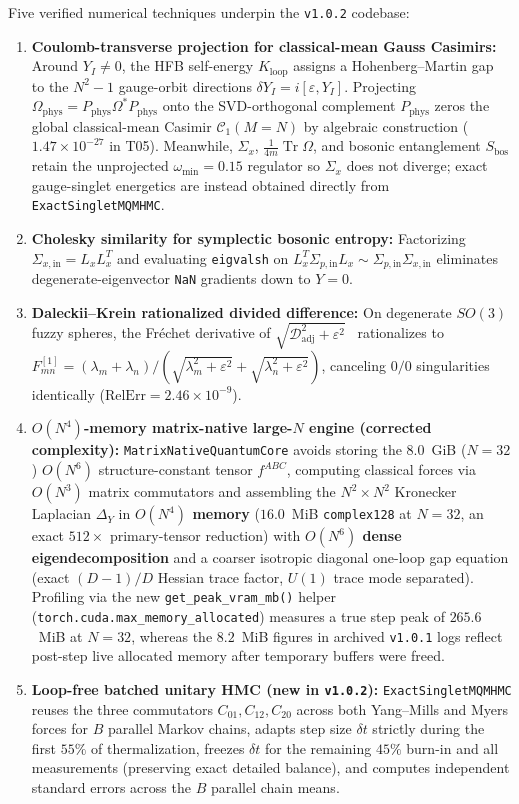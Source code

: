 \documentclass[11pt,a4paper]{article}
\DeclareMathOperator{\Tr}{Tr}
\begin{document}
Five verified numerical techniques underpin the \texttt{v1.0.2} codebase:
\begin{enumerate}
  \item \textbf{Coulomb-transverse projection for classical-mean Gauss Casimirs:} Around $Y_I \neq 0$, the HFB self-energy $K_{\mathrm{loop}}$ assigns a Hohenberg--Martin gap~\cite{Hohenberg1965} to the $N^2-1$ gauge-orbit directions $\delta Y_I = i[\varepsilon, Y_I]$. Projecting $\Omega_{\mathrm{phys}} = P_{\mathrm{phys}}\Omega^* P_{\mathrm{phys}}$ onto the SVD-orthogonal complement $P_{\mathrm{phys}}$ zeros the global classical-mean Casimir $\mathcal{C}_1(M=N)$ by algebraic construction ($1.47\times 10^{-27}$ in T05). Meanwhile, $\Sigma_x$, $\frac{1}{4m}\Tr\Omega$, and bosonic entanglement $S_{\mathrm{bos}}$ retain the unprojected $\omega_{\min}=0.15$ regulator so $\Sigma_x$ does not diverge; exact gauge-singlet energetics are instead obtained directly from \texttt{ExactSingletMQMHMC}.
  \item \textbf{Cholesky similarity for symplectic bosonic entropy:} Factorizing $\Sigma_{x,\mathrm{in}} = L_x L_x^T$ and evaluating \texttt{eigvalsh} on $L_x^T \Sigma_{p,\mathrm{in}} L_x \sim \Sigma_{p,\mathrm{in}}\Sigma_{x,\mathrm{in}}$ eliminates degenerate-eigenvector \texttt{NaN} gradients down to $Y=0$.
  \item \textbf{Daleckii--Krein rationalized divided difference:} On degenerate $SO(3)$ fuzzy spheres, the Fr\'echet derivative of $\sqrt{\mathcal{D}_{\mathrm{adj}}^2 + \varepsilon^2}$~\cite{Bhatia1997} rationalizes to $F^{[1]}_{mn} = (\lambda_m+\lambda_n)/(\sqrt{\lambda_m^2+\varepsilon^2}+\sqrt{\lambda_n^2+\varepsilon^2})$, canceling $0/0$ singularities identically ($\mathrm{RelErr} = 2.46\times 10^{-9}$).
  \item \textbf{$O(N^4)$-memory matrix-native large-$N$ engine (corrected complexity):} \texttt{MatrixNativeQuantumCore} avoids storing the $8.0$~GiB ($N=32$) $O(N^6)$ structure-constant tensor $f^{ABC}$, computing classical forces via $O(N^3)$ matrix commutators and assembling the $N^2\times N^2$ Kronecker Laplacian $\Delta_Y$ in \textbf{$O(N^4)$ memory} ($16.0$~MiB \texttt{complex128} at $N=32$, an exact $512\times$ primary-tensor reduction) with \textbf{$O(N^6)$ dense eigendecomposition} and a coarser isotropic diagonal one-loop gap equation (exact $(D-1)/D$ Hessian trace factor, $U(1)$ trace mode separated). Profiling via the new \texttt{get\_peak\_vram\_mb()} helper (\texttt{torch.cuda.max\_memory\_allocated}) measures a true step peak of $265.6$~MiB at $N=32$, whereas the $8.2$~MiB figures in archived \texttt{v1.0.1} logs reflect post-step live allocated memory after temporary buffers were freed.
  \item \textbf{Loop-free batched unitary HMC (new in \texttt{v1.0.2}):} \texttt{ExactSingletMQMHMC} reuses the three commutators $C_{01}, C_{12}, C_{20}$ across both Yang--Mills and Myers forces for $B$ parallel Markov chains, adapts step size $\delta t$ strictly during the first $55\%$ of thermalization, freezes $\delta t$ for the remaining $45\%$ burn-in and all measurements (preserving exact detailed balance), and computes independent standard errors across the $B$ parallel chain means.
\end{enumerate}
\end{document}
